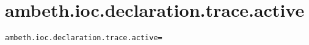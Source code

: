 \section{ambeth.ioc.declaration.trace.active}
\label{configuration:AmbethIocDeclarationTraceActive}
\AvailableInCsharpOnly{\TODO}
\begin{lstlisting}[style=Props,caption={Usage example for \textit{ambeth.ioc.declaration.trace.active}}]
ambeth.ioc.declaration.trace.active=
\end{lstlisting}
